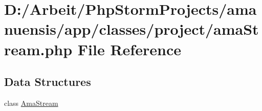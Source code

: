 \hypertarget{a00101}{}\section{D\+:/\+Arbeit/\+Php\+Storm\+Projects/amanuensis/app/classes/project/ama\+Stream.php File Reference}
\label{a00101}
\subsection*{Data Structures}
\begin{DoxyCompactItemize}
\item 
class \hyperlink{a00010}{Ama\+Stream}
\end{DoxyCompactItemize}
